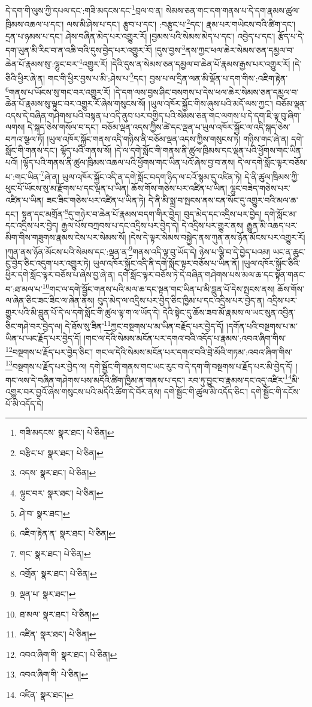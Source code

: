 དེ་དག་གི་ལུས་ཀྱི་དཔལ་དང་:གཟི་མདངས་དང་\footnote{གཟི་མདངས་  སྣར་ཐང་།  པེ་ཅིན། }བྲལ་བ་ན། སེམས་ཅན་གང་དག་གནས་པ་དེ་དག་རྣམས་ཚུལ་ཁྲིམས་འཆལ་པ་དང་། ལས་མི་ཤེས་པ་དང་། རྩུབ་པ་དང་། :བརྩུང་པ་\footnote{བརྩིང་པ་  སྣར་ཐང་།  པེ་ཅིན། }དང་། རྣམ་པར་གཡེངས་བའི་ཚིག་དང་། དྲན་པ་ཉམས་པ་དང་། ཤེས་བཞིན་མེད་པར་འགྱུར་རོ། །བྱམས་པའི་སེམས་མེད་པ་དང་། འབྱེད་པ་དང་། རྩོད་པ་དེ་དག་ཡུན་མི་རིང་བ་ན་འཆི་བའི་དུས་བྱེད་པར་འགྱུར་རོ། །དུས་བྱས་\footnote{འདས་  སྣར་ཐང་།  པེ་ཅིན། }ནས་ཀྱང་ཕལ་ཆེར་སེམས་ཅན་དམྱལ་བ་ཆེན་པོ་རྣམས་སུ་:ལྷུང་བར་\footnote{ལྟུང་བར་  སྣར་ཐང་།  པེ་ཅིན། }འགྱུར་རོ། །དེའི་དུས་ན་སེམས་ཅན་དམྱལ་བ་ཆེན་པོ་རྣམས་རྒྱས་པར་འགྱུར་རོ། །དེ་ཅིའི་ཕྱིར་ཞེ་ན། གང་གི་ཕྱིར་བྱས་པ་མི་:ཤེས་པ་\footnote{ཤེ་བ་  སྣར་ཐང་། }དང་། བྱས་པ་ལ་དྲིན་ལན་མི་ལྡོན་པ་དག་གིས་:འཇིག་རྟེན་\footnote{འཇིག་རྟེན་ན་  སྣར་ཐང་།  པེ་ཅིན། }གནས་པ་ཡོངས་སུ་གང་བར་འགྱུར་རོ། །དེ་དག་ལས་བྱས་ཤིང་བསགས་པ་དེས་ཕལ་ཆེར་སེམས་ཅན་དམྱལ་བ་ཆེན་པོ་རྣམས་སུ་ལྟུང་བར་འགྱུར་རོ་ཞེས་གསུངས་སོ། །ཡུལ་འཁོར་སྐྱོང་གིས་ཞུས་པའི་མདོ་ལས་ཀྱང་། བཅོམ་ལྡན་འདས་དེ་བཞིན་གཤེགས་པའི་བསྟན་པ་འདི་ནུབ་པར་བགྱིད་པའི་སེམས་ཅན་གང་ལགས་པ་དེ་དག་ཇི་ལྟ་བུ་ཞིག་ལགས། དེ་སྐད་ཅེས་གསོལ་བ་དང་། བཅོམ་ལྡན་འདས་ཀྱིས་ཚེ་དང་ལྡན་པ་ཡུལ་འཁོར་སྐྱོང་ལ་འདི་སྐད་ཅེས་བཀའ་སྩལ་ཏོ། །ཡུལ་འཁོར་སྐྱོང་གནས་འདི་གཉིས་ནི་བཅོམ་ལྡན་འདས་ཀྱིས་གསུངས་ཏེ། གཉིས་གང་ཞེ་ན། དགེ་སློང་གི་གནས་དང་། ལྷོད་པའི་གནས་སོ། །དེ་ལ་དགེ་སློང་གི་གནས་ནི་ཚུལ་ཁྲིམས་དང་ལྡན་པའི་ཕྱོགས་གང་ཡིན་པའོ། །ལྷོད་པའི་གནས་ནི་ཚུལ་ཁྲིམས་འཆལ་པའི་ཕྱོགས་གང་ཡིན་པའོ་ཞེས་བྱ་བ་ནས། དེ་ལ་དགེ་སློང་ལྟར་བཅོས་པ་:གང་ཡིན་\footnote{གང་  སྣར་ཐང་།  པེ་ཅིན། }ཞེ་ན། ཡུལ་འཁོར་སྐྱོང་འདི་ན་དགེ་སློང་བདག་ཉིད་ལ་ངའོ་སྙམ་དུ་འཛིན་ཏེ། དེ་ནི་ཚུལ་ཁྲིམས་ཀྱི་ཕུང་པོ་ཡོངས་སུ་མ་རྫོགས་པ་དང་ལྡན་པ་ཡིན། ཆོས་གོས་གཅེས་པར་འཛིན་པ་ཡིན། ལྷུང་བཟེད་གཅེས་པར་འཛིན་པ་ཡིན། ཟང་ཟིང་གཅེས་པར་འཛིན་པ་ཡིན་ཏེ། དེ་ནི་མི་སྨྲ་བ་སྤངས་ནས་ངན་སོང་དུ་འགྱུར་བའི་མལ་ཆ་དང་། སྟན་དང་མགྲོན་\footnote{འགྲོན་  སྣར་ཐང་།  པེ་ཅིན། }དུ་གཉེར་བ་ཆེན་པོ་རྣམས་བདག་གིར་བྱེད། བུད་མེད་དང་འདྲིས་པར་བྱེད། དགེ་སློང་མ་དང་འདྲིས་པར་བྱེད། རྒྱལ་པོས་བཀྲབས་པ་དང་འདྲིས་པར་བྱེད་དེ། དེ་འདྲིས་པར་གྱུར་ནས། རྒྱུན་མི་འཆད་པར་མིག་གིས་གཟུགས་རྣམས་ངེས་པར་སེམས་སོ། །དེས་དེ་ལྟར་སེམས་བསྐྱེད་ནས་ཀུན་ནས་ཉོན་མོངས་པར་འགྱུར་རོ། །ཀུན་ནས་ཉོན་མོངས་པའི་སེམས་དང་:ལྡན་ན་\footnote{ལྡན་པ་  སྣར་ཐང་། }གནས་འདི་ལྟ་བུ་ཡོད་དེ། ཉེས་པ་ལྕི་བ་དེ་བྱེད་པའམ། ཡང་ན་ཆུང་ངུ་བྱེད་ཅིང་འདུག་པར་འགྱུར་ཏེ། ཡུལ་འཁོར་སྐྱོང་འདི་ནི་དགེ་སློང་ལྟར་བཅོས་པ་ཡིན་ནོ། །ཡུལ་འཁོར་སྐྱོང་ཅིའི་ཕྱིར་དགེ་སློང་ལྟར་བཅོས་པ་ཞེས་བྱ་ཞེ་ན། དགེ་སློང་ལྟར་བཅོས་ཏེ་དེ་བཞིན་གཤེགས་པས་མལ་ཆ་དང་སྟན་གནང་བ་:ཐ་མལ་པ་\footnote{ཐ་མལ་  སྣར་ཐང་།  པེ་ཅིན། }གང་ལ་དགེ་སྦྱོང་གནས་པའི་མལ་ཆ་དང་སྟན་གང་ཡིན་པ་མི་བླུན་པོ་དེས་སྤངས་ནས། ཆོས་གོས་ལ་ཞེན་ཅིང་ཟང་ཟིང་ལ་ཞེན་ནས། བུད་མེད་ལ་འདྲིས་པར་བྱེད་ཅིང་ཁྱིམ་པ་དང་འདྲིས་པར་བྱེད་ན། འདྲིས་པར་གྱུར་པའི་མི་བླུན་པོ་དེ་ལ་དགེ་སློང་གི་ཚུལ་ལྟ་ག་ལ་ཡོད་དེ། དེའི་སྟེང་དུ་ཆོས་ཟབ་མོ་རྣམས་ལ་ཡང་སུན་འབྱིན་ཅིང་གཤེ་བར་བྱེད་ལ། དེ་ཐོས་སུ་ཟིན་\footnote{འཛིན་  སྣར་ཐང་།  པེ་ཅིན། }ཀྱང་བསྔགས་པ་མ་ཡིན་བརྗོད་པར་བྱེད་དོ། །དགོན་པའི་བསྔགས་པ་མ་ཡིན་པ་ཡང་རྗོད་པར་བྱེད་དོ། །གང་ལ་དེའི་སེམས་མངོན་པར་དགའ་བའི་འདོད་པ་རྣམས་:འབའ་ཞིག་གིས་\footnote{འབའ་ཞིག་གི་  སྣར་ཐང་།  པེ་ཅིན། }བསྔགས་པ་རྗོད་པར་བྱེད་ཅིང་། གང་ལ་དེའི་སེམས་མངོན་པར་དགའ་བའི་བྲེ་མོའི་གཏམ་:འབའ་ཞིག་གིས་\footnote{འབའ་ཞིག་གི་  པེ་ཅིན། }བསྔགས་པ་རྗོད་པར་བྱེད་ལ། དགེ་སྦྱོང་གི་གནས་གང་ཡང་རུང་བ་དེ་དག་གི་བསྔགས་པ་རྗོད་པར་མི་བྱེད་དོ། །གང་ལས་དེ་བཞིན་གཤེགས་པས་མདོའི་ཚིག་ཁྱིམ་ན་གནས་པ་དང་། རབ་ཏུ་བྱུང་བ་རྣམས་དང་འདུ་འཛིར་\footnote{འཛིན་  སྣར་ཐང་། }མི་འགྱུར་བར་བྱའོ་ཞེས་གསུངས་པའི་མདོའི་ཚིག་དེ་བོར་ནས། དགེ་སྦྱོང་གི་ཚུལ་མི་འདོད་ཅིང་། དགེ་སྦྱོང་གི་དངོས་པོ་མི་འདོད་དེ། 